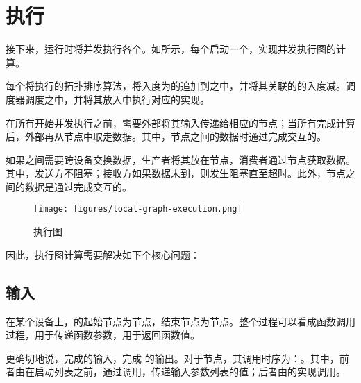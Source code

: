 \section{执行}
\label{sec:graph-operation-exec}

接下来，运行时将并发执行各个。如所示，每个启动一个，实现并发执行图的计算。

每个将执行的拓扑排序算法，将入度为的追加到之中，并将其关联的的入度减。调度器调度之中，并将其放入中执行对应的实现。

在所有开始并发执行之前，需要外部将其输入传递给相应的节点；当所有完成计算后，外部再从节点中取走数据。其中，节点之间的数据时通过完成交互的。

如果之间需要跨设备交换数据，生产者将其放在节点，消费者通过节点获取数据。其中，发送方不阻塞；接收方如果数据未到，则发生阻塞直至超时。此外，节点之间的数据是通过完成交互的。

\begin{figure}[H]
\centering
\texttt{[image: figures/local-graph-execution.png]}
\caption{执行图}
 \label{fig:local-graph-execution}
\end{figure}

因此，执行图计算需要解决如下个核心问题：

\begin{enum}
\end{enum}

\subsection{输入}

在某个设备上，的起始节点为节点，结束节点为节点。整个过程可以看成函数调用过程，用于传递函数参数，用于返回函数值。

更确切地说，完成的输入，完成
的输出。对于节点，其调用时序为：。其中，前者由在启动列表之前，通过调用，传递输入参数列表的值；后者由的实现调用。

